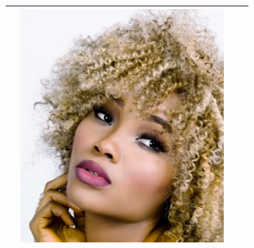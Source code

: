 \begin{longtable}{|N||c|c|c|}
\begin{minipage}{.29\textwidth}
  \end{minipage} & 
  \begin{minipage}{.29\textwidth}
    \includegraphics[width=\textwidth,height=\textheight,keepaspectratio]{images/match_other_2_res}
  \end{minipage} \\
    \hline
\end{longtable}